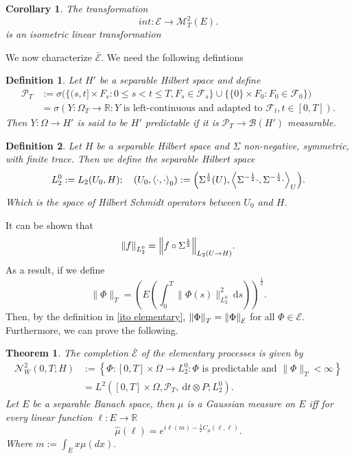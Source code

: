 \documentclass[12pt]{article}
\newcommand{\br}[1]{\left\langle#1\right\rangle}
\newcommand{\R}{{\mathbb R}}
\newtheorem{theorem}{Theorem}
\newtheorem{definition}{Definition}
\newtheorem{corollary}{Corollary}
\begin{document}
\begin{corollary}
	The transformation
	\begin{equation*}
		int:\mathcal{E}\to \mathcal{M}_T^2(E).
	\end{equation*}
	is an isometric linear transformation
\end{corollary}
We now characterize $\bar{\mathcal{E}}$. We need the following defintions
\begin{definition}
	Let $H'$ be a separable Hilbert space and define
	\begin{align*}
		\mathcal{P}_{T} & :=\sigma\Big(\big\{(s, t] \times F_{s} :0 \leq s<t \leq T, F_{s} \in \mathcal{F}_{s}\big\} \cup\big\{\{0\} \times F_{0} :F_{0} \in \mathcal{F}_{0}\big\}\Big) \\
		                & =\sigma(Y: \Omega_{T} \rightarrow \mathbb{R} :Y \text { is left-continuous and adapted to }
		\mathcal{F}_{t}, t \in[0, T]) .
	\end{align*}
	Then $Y:\Omega\to H'$ is said to be $H'$ predictable if it is $\mathcal{P}_T\to\mathcal{B}(H')$ measurable.
\end{definition}
\begin{definition}
	Let $H$ be a separable Hilbert space and $\Sigma$ non-negative, symmetric, with finite trace. Then we define the separable Hilbert space
	\begin{equation*}
		L_2^0:=L_2(U_0,H);\quad (U_0,\br{\cdot,\cdot}_0):=\qty(\Sigma^{\frac{1}{2}}(U),\br{\Sigma^{-\frac{1}{2}}\cdot,\Sigma^{-\frac{1}{2}}\cdot}_U).
	\end{equation*}
	Which is the space of Hilbert Schmidt operators between $U_0$ and $H$.
\end{definition}
It can be shown that
\begin{equation*}
	\norm{f}_{L_{2}^{0}}=\norm{f\circ \Sigma^\frac{1}{2}}_{L_2(U\to H)}.
\end{equation*}
As a result, if we define
\begin{equation*}
	\|\Phi\|_{T}=\left(E\left(\int_{0}^{T}\|\Phi(s)\|_{L_{2}^{0}}^{2} \mathrm{~d} s\right)\right)^{\frac{1}{2}}.
\end{equation*}
Then, by the definition in \ref{ito elementary}, $\norm{\Phi}_T=\norm{\Phi}_\mathcal{E}$ for all $\Phi\in\mathcal{E}$. Furthermore, we can prove the following.
\begin{theorem}
	The completion $\bar{\mathcal{E}}$ of the elementary processes is given by
	\begin{align*}
		\mathcal{N}_{W}^{2}(0, T ; H) & :=\left\{\Phi:[0, T] \times \Omega \rightarrow L_{2}^{0} :\Phi \text { is predictable and }\|\Phi\|_{T}<\infty\right\} \\
		                              & =L^{2}\left([0, T] \times \Omega, \mathcal{P}_{T}, \mathrm{~d} t \otimes P ; L_{2}^{0}\right) .
	\end{align*}
	Let $E$ be a separable Banach space, then $\mu $ is a Gaussian measure on $E$ iff for every linear function  $\ell :E\to\R$
	\begin{equation*}
		\hat{\mu }(\ell )=e^{i\ell(m)-\frac{1}{2}C_\mu (\ell ,\ell )}.
	\end{equation*}
	Where
	$    	m:=\int_{E}x \mu (dx).
	$
\end{theorem}

\end{document}
